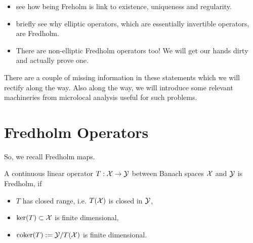 \documentclass{article}
\begin{document}
\begin{itemize}
    \item see how being Freholm is link to existence, uniqueness and regularity. 
    \item briefly see why elliptic operators, which are essentially invertible operators, are Fredholm. 
    \item There are non-elliptic Fredholm operators too! We will get our hands dirty and actually prove one. 
\end{itemize}
There are a couple of missing information in these statements which we will rectify along the way. Also along the way, we will introduce some relevant machineries from microlocal analysis  useful for such problems. 



\section{Fredholm Operators} 
So, we recall Fredholm maps. 
\begin{definition}
    A continuous linear operator $T : \mathcal{X} \to\mathcal{Y}$ between Banach spaces $\mathcal{X}$ and $\mathcal{Y}$ is Fredholm, if 
    \begin{itemize}
        \item $T$ has closed range, i.e. $T(\mathcal{X})$ is closed in $\mathcal{Y}$, 
        \item ${\mathrm{ker}}(T) \subset \mathcal{X} $ is finite dimensional, 
        \item ${\mathrm{coker}}(T) := \mathcal{Y} / T(\mathcal{X})$ is finite dimensional. 
    \end{itemize}
\end{definition}
\end{document}
